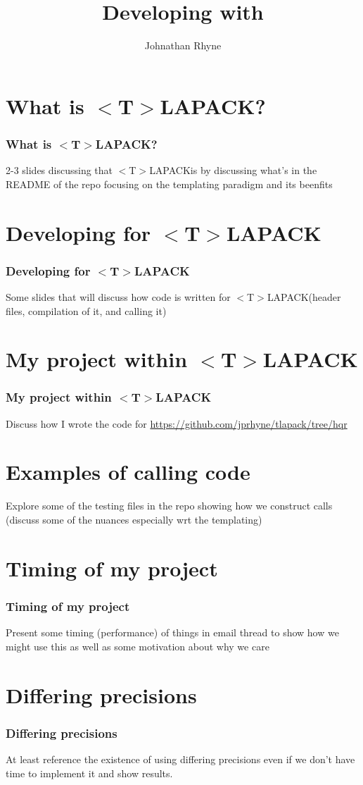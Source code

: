 \documentclass[12pt]{beamer}
\author{Johnathan Rhyne}
\title{Developing with \tlapack}
\newcommand{\tlapack}{$<$T$>$LAPACK}
\begin{document}
    \begin{frame}
        \maketitle
    \end{frame}
    \begin{frame}
        \tableofcontents
    \end{frame}
    \section{What is \tlapack?}
    \begin{frame}
        \frametitle{What is \tlapack?}
        2-3 slides discussing that \tlapack is by discussing what's in the README of the 
        repo focusing on the templating paradigm and its beenfits
    \end{frame}
    \section{Developing for \tlapack}
    \begin{frame}
        \frametitle{Developing for \tlapack}
        Some slides that will discuss how code is written for \tlapack (header files, 
        compilation of it, and calling it)
    \end{frame}
    \section{My project within \tlapack}
    \begin{frame}
        \frametitle{My project within \tlapack}
        Discuss how I wrote the code for \url{https://github.com/jprhyne/tlapack/tree/hqr}
    \end{frame}
    \section{Examples of calling code}
    \begin{frame}
        Explore some of the testing files in the repo showing how we construct calls (discuss some of the nuances 
        especially wrt the templating) 
    \end{frame}
    \section{Timing of my project}
    \begin{frame}
        \frametitle{Timing of my project}
        Present some timing (performance) of things in email thread to show how we might use this as well as 
        some motivation about why we care
    \end{frame}
    \section{Differing precisions}
    \begin{frame}
        \frametitle{Differing precisions}
        At least reference the existence of using differing precisions even if we don't have time to implement it
        and show results.
    \end{frame}
\end{document}
